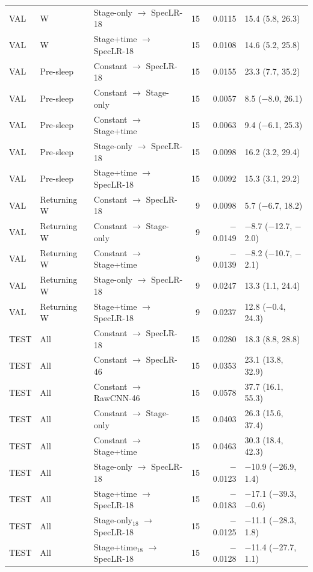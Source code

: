 {{\begin{longtable}{@{}lllrrl@{}}
VAL & W & Stage-only $\to$ SpecLR-18 & 15 & 0.0115 & 15.4 (5.8, 26.3) \\
VAL & W & Stage+time $\to$ SpecLR-18 & 15 & 0.0108 & 14.6 (5.2, 25.8) \\
\addlinespace[1pt]
VAL & Pre-sleep & Constant $\to$ SpecLR-18 & 15 & 0.0155 & 23.3 (7.7, 35.2) \\
VAL & Pre-sleep & Constant $\to$ Stage-only & 15 & 0.0057 & 8.5 ($-$8.0, 26.1) \\
VAL & Pre-sleep & Constant $\to$ Stage+time & 15 & 0.0063 & 9.4 ($-$6.1, 25.3) \\
VAL & Pre-sleep & Stage-only $\to$ SpecLR-18 & 15 & 0.0098 & 16.2 (3.2, 29.4) \\
VAL & Pre-sleep & Stage+time $\to$ SpecLR-18 & 15 & 0.0092 & 15.3 (3.1, 29.2) \\
\addlinespace[1pt]
VAL & Returning W & Constant $\to$ SpecLR-18 & 9 & 0.0098 & 5.7 ($-$6.7, 18.2) \\
VAL & Returning W & Constant $\to$ Stage-only & 9 & $-$0.0149 & $-$8.7 ($-$12.7, $-$2.0) \\
VAL & Returning W & Constant $\to$ Stage+time & 9 & $-$0.0139 & $-$8.2 ($-$10.7, $-$2.1) \\
VAL & Returning W & Stage-only $\to$ SpecLR-18 & 9 & 0.0247 & 13.3 (1.1, 24.4) \\
VAL & Returning W & Stage+time $\to$ SpecLR-18 & 9 & 0.0237 & 12.8 ($-$0.4, 24.3) \\
\addlinespace[1pt]
TEST & All & Constant $\to$ SpecLR-18 & 15 & 0.0280 & 18.3 (8.8, 28.8) \\
TEST & All & Constant $\to$ SpecLR-46 & 15 & 0.0353 & 23.1 (13.8, 32.9) \\
TEST & All & Constant $\to$ RawCNN-46 & 15 & 0.0578 & 37.7 (16.1, 55.3) \\
TEST & All & Constant $\to$ Stage-only & 15 & 0.0403 & 26.3 (15.6, 37.4) \\
TEST & All & Constant $\to$ Stage+time & 15 & 0.0463 & 30.3 (18.4, 42.3) \\
TEST & All & Stage-only $\to$ SpecLR-18 & 15 & $-$0.0123 & $-$10.9 ($-$26.9, 1.4) \\
TEST & All & Stage+time $\to$ SpecLR-18 & 15 & $-$0.0183 & $-$17.1 ($-$39.3, $-$0.6) \\
TEST & All & Stage-only$_{18}$ $\to$ SpecLR-18 & 15 & $-$0.0125 & $-$11.1 ($-$28.3, 1.8) \\
TEST & All & Stage+time$_{18}$ $\to$ SpecLR-18 & 15 & $-$0.0128 & $-$11.4 ($-$27.7, 1.1) \\

\end{longtable}}}
